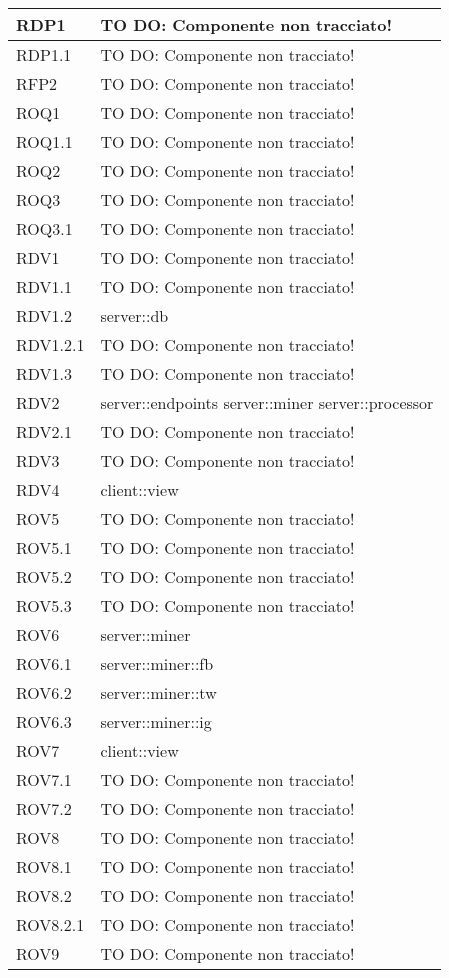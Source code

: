 \begin{center}
\begin{longtable}{| p{4cm} | p{8cm} |}
\hline
RDP1 & TO DO: Componente non tracciato! \\
\hline
RDP1.1 & TO DO: Componente non tracciato! \\
\hline
RFP2 & TO DO: Componente non tracciato! \\
\hline
ROQ1 & TO DO: Componente non tracciato! \\
\hline
ROQ1.1 & TO DO: Componente non tracciato! \\
\hline
ROQ2 & TO DO: Componente non tracciato! \\
\hline
ROQ3 & TO DO: Componente non tracciato! \\
\hline
ROQ3.1 & TO DO: Componente non tracciato! \\
\hline
RDV1 & TO DO: Componente non tracciato! \\
\hline
RDV1.1 & TO DO: Componente non tracciato! \\
\hline
RDV1.2 & server::db \\
\hline
RDV1.2.1 & TO DO: Componente non tracciato! \\
\hline
RDV1.3 & TO DO: Componente non tracciato! \\
\hline
RDV2 & server::endpoints \newline server::miner \newline server::processor \\
\hline
RDV2.1 & TO DO: Componente non tracciato! \\
\hline
RDV3 & TO DO: Componente non tracciato! \\
\hline
RDV4 & client::view \\
\hline
ROV5 & TO DO: Componente non tracciato! \\
\hline
ROV5.1 & TO DO: Componente non tracciato! \\
\hline
ROV5.2 & TO DO: Componente non tracciato! \\
\hline
ROV5.3 & TO DO: Componente non tracciato! \\
\hline
ROV6 & server::miner \\
\hline
ROV6.1 & server::miner::fb \\
\hline
ROV6.2 & server::miner::tw \\
\hline
ROV6.3 & server::miner::ig \\
\hline
ROV7 & client::view \\
\hline
ROV7.1 & TO DO: Componente non tracciato! \\
\hline
ROV7.2 & TO DO: Componente non tracciato! \\
\hline
ROV8 & TO DO: Componente non tracciato! \\
\hline
ROV8.1 & TO DO: Componente non tracciato! \\
\hline
ROV8.2 & TO DO: Componente non tracciato! \\
\hline
ROV8.2.1 & TO DO: Componente non tracciato! \\
\hline
ROV9 & TO DO: Componente non tracciato! \\
\hline
\end{longtable}
\egroup
\end{center}
